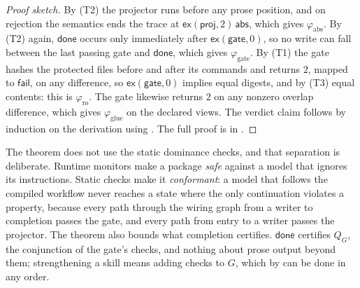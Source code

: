 \documentclass[11pt]{article}
\theoremstyle{definition}
\theoremstyle{plain}
\newcommand{\fail}{\mathsf{fail}}
\newcommand{\gate}{\mathsf{gate}}
\newcommand{\proj}{\mathsf{proj}}
\newcommand{\ex}{\mathsf{ex}}
\newcommand{\done}{\mathsf{done}}
\newcommand{\abs}{\mathsf{abs}}
\begin{document}
\begin{proof}[Proof sketch]
By (T2) the projector runs before any prose position, and on rejection the semantics ends the trace at $\ex(\proj, 2)\,\abs$, which gives $\varphi_{\mathrm{abs}}$. By (T2) again, $\done$ occurs only immediately after $\ex(\gate, 0)$, so no write can fall between the last passing gate and $\done$, which gives $\varphi_{\mathrm{gate}}$. By (T1) the gate hashes the protected files before and after its commands and returns $2$, mapped to $\fail$, on any difference, so $\ex(\gate, 0)$ implies equal digests, and by (T3) equal contents: this is $\varphi_{\mathrm{ro}}$. The gate likewise returns $2$ on any nonzero overlap difference, which gives $\varphi_{\mathrm{glue}}$ on the declared views. The verdict claim follows by induction on the derivation using . The full proof is in .
\end{proof}

The theorem does not use the static dominance checks, and that separation is deliberate. Runtime monitors make a package \emph{safe} against a model that ignores its instructions. Static checks make it \emph{conformant}: a model that follows the compiled workflow never reaches a state where the only continuation violates a property, because every path through the wiring graph from a writer to completion passes the gate, and every path from entry to a writer passes the projector. The theorem also bounds what completion certifies. $\done$ certifies $Q_G$, the conjunction of the gate's checks, and nothing about prose output beyond them; strengthening a skill means adding checks to $G$, which by  can be done in any order.
\end{document}
